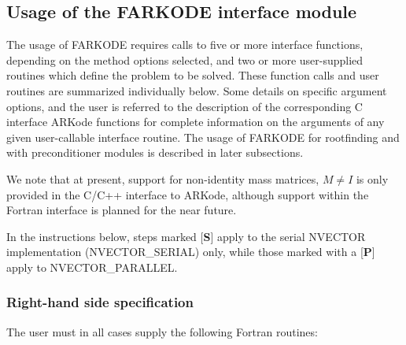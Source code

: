 \documentclass[letterpaper,10pt,english]{sphinxmanual}
\begin{document}
\subsection{Usage of the FARKODE interface module}
\label{f_interface/Usage:finterface-usage}\label{f_interface/Usage::doc}\label{f_interface/Usage:usage-of-the-farkode-interface-module}
The usage of FARKODE requires calls to five or more interface
functions, depending on the method options selected, and two or more
user-supplied routines which define the problem to be solved.  These
function calls and user routines are summarized individually below.
Some details on specific argument options, and the user is referred to
the description of the corresponding C interface ARKode functions for
complete information on the arguments of any given user-callable
interface routine.  The usage of FARKODE for rootfinding and with
preconditioner modules is described in later subsections.

We note that at present, support for non-identity mass matrices,
$M\ne I$ is only provided in the C/C++ interface to ARKode,
although support within the Fortran interface is planned for the near
future.

In the instructions below, steps marked {[}\textbf{S}{]} apply to the serial
NVECTOR implementation (NVECTOR\_SERIAL) only, while those
marked with a {[}\textbf{P}{]} apply to NVECTOR\_PARALLEL.


\subsubsection{Right-hand side specification}
\label{f_interface/Usage:right-hand-side-specification}\label{f_interface/Usage:finterface-rhs}
The user must in all cases supply the following Fortran routines:
\end{document}
